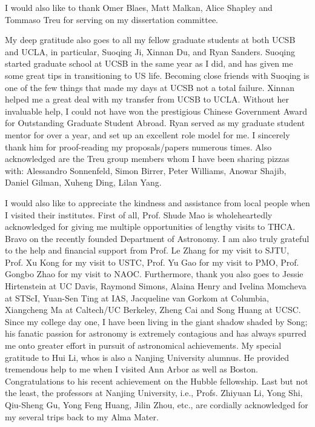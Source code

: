 I would also like to thank Omer Blaes, Matt Malkan, Alice Shapley and Tommaso Treu for serving on my dissertation
committee.

My deep gratitude also goes to all my fellow graduate students at both UCSB and UCLA, in particular, Suoqing Ji,
Xinnan Du, and Ryan Sanders.
Suoqing started graduate school at UCSB in the same year as I did, and has given me some great tips in
transitioning to US life.
Becoming close friends with Suoqing is one of the few things that made my days at UCSB not a total failure.
Xinnan helped me a great deal with my transfer from UCSB to UCLA.
Without her invaluable help, I could not have won the prestigious Chinese Government Award for Outstanding
Graduate Student Abroad.
Ryan served as my graduate student mentor for over a year, and set up an excellent role model for me.
I sincerely thank him for proof-reading my proposals/papers numerous times.
Also acknowledged are the Treu group members whom I have been sharing pizzas with:
Alessandro Sonnenfeld, Simon Birrer, Peter Williams, Anowar Shajib, Daniel Gilman, Xuheng Ding, Lilan Yang.

I would also like to appreciate the kindness and assistance from local people when I visited their institutes.
First of all, Prof. Shude Mao is wholeheartedly acknowledged for giving me multiple opportunities of lengthy visits to THCA.
Bravo on the recently founded Department of Astronomy.
I am also truly grateful to the help and financial support from Prof. Le Zhang for my visit to SJTU, 
Prof. Xu Kong for my visit to USTC, Prof. Yu Gao for my visit to PMO, Prof. Gongbo Zhao for my visit to NAOC.
Furthermore, thank you also goes to Jessie Hirtenstein at UC Davis,
Raymond Simons, Alaina Henry and Ivelina Momcheva at STScI,
Yuan-Sen Ting at IAS,
Jacqueline van Gorkom at Columbia,
Xiangcheng Ma at Caltech/UC Berkeley,
Zheng Cai and Song Huang at UCSC.
Since my college day one, I have been living in the giant shadow shaded by Song; 
his fanatic passion for astronomy is extremely contagious and has always spurred me onto greater effort in
pursuit of astronomical achievements.
My special gratitude to Hui Li, whos is also a Nanjing University alumnus.
He provided tremendous help to me when I visited Ann Arbor as well as Boston.
Congratulations to his recent achievement on the Hubble fellowship.
Last but not the least, the professors at Nanjing University, i.e., Profs. Zhiyuan Li, Yong Shi, Qiu-Sheng Gu,
Yong Feng Huang, Jilin Zhou, etc., are cordially acknowledged for my several trips back to my Alma Mater.




%
%
%
%


